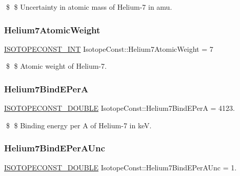 \$ \$ Uncertainty in atomic mass of Helium-\/7 in amu. \mbox{\label{group___isotope_const-_helium-_he7_gabdff7e5421b2d944a9de78bdf3467e8e}} 
\subsubsection{\texorpdfstring{Helium7\+Atomic\+Weight}{Helium7AtomicWeight}}
{\footnotesize\ttfamily \mbox{\hyperlink{group___isotope_const-_macros_ga5f18360b3e99483a35c32d789e62621c}{I\+S\+O\+T\+O\+P\+E\+C\+O\+N\+S\+T\+\_\+\+I\+NT}} Isotope\+Const\+::\+Helium7\+Atomic\+Weight = 7}

\$ \$ Atomic weight of Helium-\/7. \mbox{\label{group___isotope_const-_helium-_he7_ga24c17f71b6b04e0c11c0bbddc77638cd}} 
\subsubsection{\texorpdfstring{Helium7\+Bind\+E\+PerA}{Helium7BindEPerA}}
{\footnotesize\ttfamily \mbox{\hyperlink{group___isotope_const-_macros_ga8f45a7272ce02c0b4c65c44636ed719a}{I\+S\+O\+T\+O\+P\+E\+C\+O\+N\+S\+T\+\_\+\+D\+O\+U\+B\+LE}} Isotope\+Const\+::\+Helium7\+Bind\+E\+PerA = 4123.}

\$ \$ Binding energy per A of Helium-\/7 in keV. \mbox{\label{group___isotope_const-_helium-_he7_gaf9063f959b7a44cdc17f84de29d2660a}} 
\subsubsection{\texorpdfstring{Helium7\+Bind\+E\+Per\+A\+Unc}{Helium7BindEPerAUnc}}
{\footnotesize\ttfamily \mbox{\hyperlink{group___isotope_const-_macros_ga8f45a7272ce02c0b4c65c44636ed719a}{I\+S\+O\+T\+O\+P\+E\+C\+O\+N\+S\+T\+\_\+\+D\+O\+U\+B\+LE}} Isotope\+Const\+::\+Helium7\+Bind\+E\+Per\+A\+Unc = 1.}

